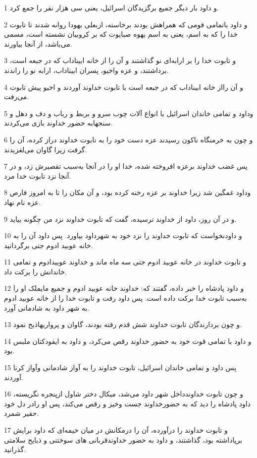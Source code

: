 \par 1 و داود بار دیگر جمیع برگزیدگان اسرائیل، یعنی سی هزار نفر را جمع کرد.
\par 2 و داود باتمامی قومی که همراهش بودند برخاسته، ازبعلی یهودا روانه شدند تا تابوت خدا را که به اسم، یعنی به اسم یهوه صبایوت که بر کروبیان نشسته است، مسمی می‌باشد، از آنجا بیاورند.
\par 3 و تابوت خدا را بر ارابه‌ای نو گذاشتند و آن را از خانه ابیناداب که در جبعه است، برداشتند، و عزه واخیو، پسران ابیناداب، ارابه نو را راندند.
\par 4 و آن رااز خانه ابیناداب که در جبعه است با تابوت خداوند آوردند و اخیو پیش تابوت می‌رفت.
\par 5 وداود و تمامی خاندان اسرائیل با انواع آلات چوب سرو و بربط و رباب و دف و دهل و سنجهابه حضور خداوند بازی می‌کردند.
\par 6 و چون به خرمنگاه ناکون رسیدند عزه دست خود را به تابوت خداوند دراز کرده، آن را گرفت زیرا گاوان می‌لغزیدند.
\par 7 پس غضب خداوند برعزه افروخته شده، خدا او را در آنجا به‌سبب تقصیرش زد، و در آنجا نزد تابوت خدا مرد.
\par 8 وداود غمگین شد زیرا خداوند بر عزه رخنه کرده بود، و آن مکان را تا به امروز فارص عزه نام نهاد.
\par 9 و در آن روز، داود از خداوند ترسیده، گفت که تابوت خداوند نزد من چگونه بیاید.
\par 10 و داودنخواست که تابوت خداوند را نزد خود به شهرداود بیاورد. پس داود آن را به خانه عوبید ادوم جتی برگردانید.
\par 11 و تابوت خداوند در خانه عوبید ادوم جتی سه ماه ماند و خداوند عوبیدادوم و تمامی خاندانش را برکت داد.
\par 12 و داود پادشاه را خبر داده، گفتند که: خداوند خانه عوبید ادوم و جمیع مایملک او را به‌سبب تابوت خدا برکت داده است. پس داود رفت و تابوت خدا را از خانه عوبید ادوم به شهر داود به شادمانی آورد.
\par 13 و چون بردارندگان تابوت خداوند شش قدم رفته بودند، گاوان و پرواریهاذبح نمود.
\par 14 و داود با تمامی قوت خود به حضور خداوند رقص می‌کرد، و داود به ایفودکتان ملبس بود.
\par 15 پس داود و تمامی خاندان اسرائیل، تابوت خداوند را به آواز شادمانی وآواز کرنا آوردند.
\par 16 و چون تابوت خداوندداخل شهر داود می‌شد، میکال دختر شاول ازپنجره نگریسته، داود پادشاه را دید که به حضورخداوند جست وخیز و رقص می‌کند، پس او رادر دل خود حقیر شمرد.
\par 17 و تابوت خداوند را درآورده، آن را درمکانش در میان خیمه‌ای که داود برایش برپاداشته بود، گذاشتند، و داود به حضور خداوندقربانی های سوختنی و ذبایح سلامتی گذرانید.
